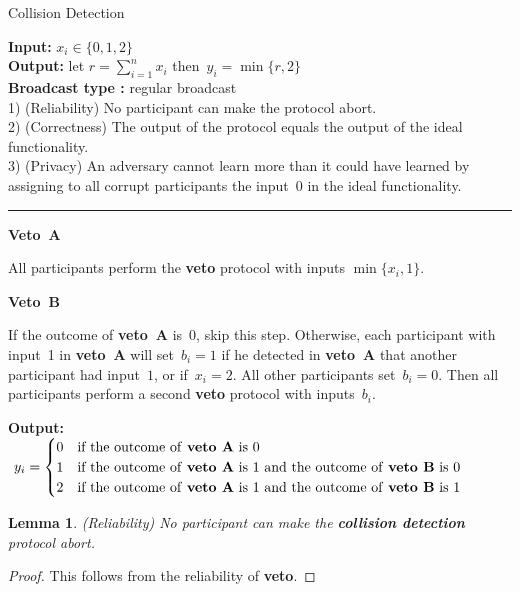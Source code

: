 \documentclass[11pt]{article}
\newtheorem{lemma}[theorem]{Lemma}
\begin{document}
\begin{protocol}
\caption{Collision Detection} \label{prot:collision-detection}

{\bf Input:} $x_i \in \{0,1,2\}$ \\
{\bf Output:} let $r=\sum_{i=1}^n x_i$ then~$y_i=\min\{r,2\}$  \\
{\bf Broadcast type :}  regular broadcast\\
1) (Reliability) No participant can make the protocol abort.\\
2) (Correctness) The output of the protocol equals the output of
the ideal functionality.\\
3) (Privacy)  An adversary cannot learn more than it could have
learned by assigning to all corrupt participants the input~$0$ in
the ideal functionality.

\vspace{4pt} \hrule \vspace{4pt}

{\bf Veto~A}

All participants perform the \textbf{veto} protocol with inputs
$\min\{x_i,1\}$.\\

\vspace{-.4cm}

{\bf Veto~B}

If the outcome of \textbf{veto~A} is~$0$, skip this step. Otherwise,
each participant with input~1 in \textbf{veto~A} will set~$b_i=1$ if
he detected in \textbf{veto~A} that another participant had
input~$1$, or if~$x_i=2$. All other participants set~$b_i=0$. Then
all participants perform a second \textbf{veto} protocol with
inputs~$b_i$.\\

\vspace{-.4cm}

{\bf Output:} $\ y_i = \begin{cases} 0 &\text{if the
outcome of \textbf{veto~A} is~0}\\
1 &\text{if the outcome of \textbf{veto~A} is~1 and the outcome of
\textbf{veto~B}
is~0 }\\
2  &\text{if the outcome of \textbf{veto~A} is~1 and the outcome of
\textbf{veto~B} is~1}
\end{cases}$

\end{protocol}


\begin{lemma}(Reliability)
No participant can make the \textbf{collision detection} protocol
abort.
\end{lemma}
\begin{proof}
This follows from the reliability of \textbf{veto}.
\end{proof}
\end{document}
